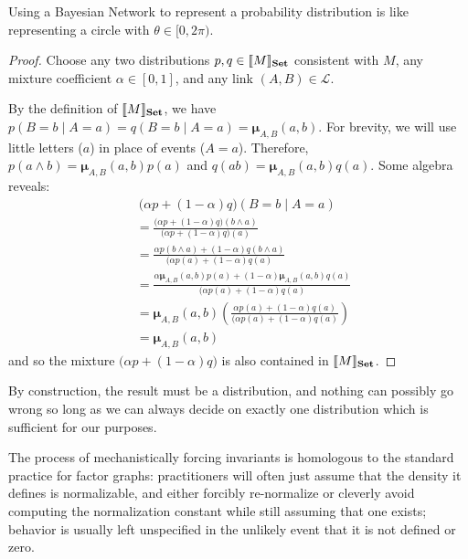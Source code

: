 \documentclass{article}
\newcommand\Set{\textbf{Set}}
\newcommand\bmu{\boldsymbol{\mu}}
\begin{document}
\begin{vfull}
		Using a Bayesian Network to represent a probability distribution is like representing a circle with $\theta \in [0, 2\pi)$. 	\begin{proof}
			Choose any two distributions $p, q \in \bbr{M}_\Set$ consistent with $M$, any mixture coefficient $\alpha \in [0,1]$, and any link $(A,B) \in \mathcal L$.
			
			By the definition of $\bbr{M}_\Set$, we have $p(B = b \mid A = a) = q(B = b \mid A = a) = \bmu_{A,B}(a,b)$.  
			For brevity, we will use little letters ($a$) in place of events ($A = a$).
			Therefore, $p(a\land b) = \bmu_{A,B}(a,b) p(a)$ and $q(ab) = \bmu_{A,B}(a,b) q(a)$. Some algebra reveals:
			\begin{align*}
				&~ \Big( \alpha p + (1-\alpha) q \Big) (B = b \mid A = a)\\ &= 
				\frac{\Big( \alpha p + (1-\alpha) q \Big) (b \land a)}{\Big( \alpha p + (1-\alpha) q \Big) (a)} \\
				&= \frac{ \alpha p(b \land a) + (1-\alpha) q(b \land a) }{\Big( \alpha p(a) + (1-\alpha) q (a)} \\
				&= \frac{ \alpha \bmu_{A,B}(a,b) p(a) + (1-\alpha) \bmu_{A,B}(a,b) q(a) }{\Big( \alpha p(a) + (1-\alpha) q (a)} \\
				&=\bmu_{A,B}(a,b) \left(\frac{ \alpha  p(a) + (1-\alpha) q(a) }{\Big( \alpha p(a) + (1-\alpha) q (a)}\right)\\
				&= \bmu_{A,B}(a,b)
			\end{align*}
			and so the mixture $\Big(\alpha p + (1-\alpha) q \Big)$ is also contained in $\bbr{M}_\Set$.
		\end{proof}
		By construction, the result must be a distribution, and nothing can possibly go wrong so long as we can always decide on exactly one distribution which is sufficient for our purposes.
		
		
		The process of mechanistically forcing invariants is homologous to the standard practice for factor graphs: practitioners will often just assume that the density it defines is normalizable, and either forcibly re-normalize or cleverly avoid computing the normalization constant while still assuming that one exists; behavior is usually left unspecified in the unlikely event that it is not defined or zero.
	\end{vfull}
	
\end{document}
